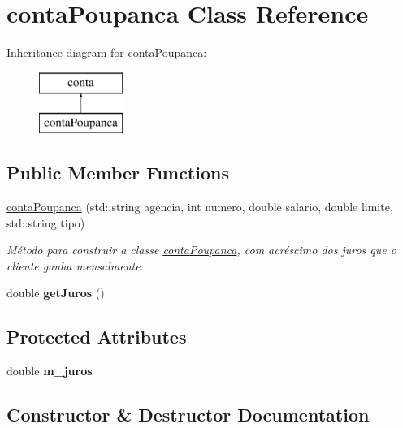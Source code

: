 \hypertarget{classcontaPoupanca}{}\section{conta\+Poupanca Class Reference}
\label{classcontaPoupanca}
Inheritance diagram for conta\+Poupanca\+:\begin{figure}[H]
\begin{center}
\leavevmode
\includegraphics[height=2.000000cm]{classcontaPoupanca}
\end{center}
\end{figure}
\subsection*{Public Member Functions}
\begin{DoxyCompactItemize}
\item 
\mbox{\hyperlink{classcontaPoupanca_aa570c28db5a2567cdd11f2fefd44476d}{conta\+Poupanca}} (std\+::string agencia, int numero, double salario, double limite, std\+::string tipo)
\begin{DoxyCompactList}\small\item\em Método para construir a classe \mbox{\hyperlink{classcontaPoupanca}{conta\+Poupanca}}, com acréscimo dos juros que o cliente ganha mensalmente. \end{DoxyCompactList}\item 
\mbox{\label{classcontaPoupanca_a62b2f875138e888f73338b04a44ea6d9}} 
double {\bfseries get\+Juros} ()
\end{DoxyCompactItemize}
\subsection*{Protected Attributes}
\begin{DoxyCompactItemize}
\item 
\mbox{\label{classcontaPoupanca_a034be448c539bcfabff697ab47717fe8}} 
double {\bfseries m\+\_\+juros}
\end{DoxyCompactItemize}


\subsection{Constructor \& Destructor Documentation}
\mbox{\label{classcontaPoupanca_aa570c28db5a2567cdd11f2fefd44476d}} 
